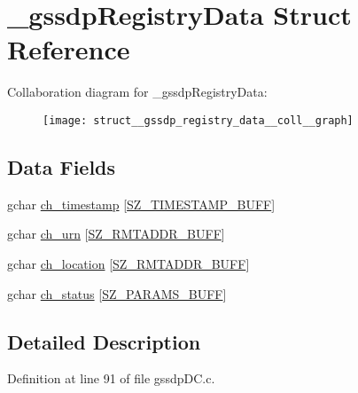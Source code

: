 \hypertarget{struct__gssdp_registry_data}{\section{\+\_\+gssdp\+Registry\+Data Struct Reference}
\label{struct__gssdp_registry_data}
}


Collaboration diagram for \+\_\+gssdp\+Registry\+Data\+:\nopagebreak
\begin{figure}[H]
\begin{center}
\leavevmode
\texttt{[image: struct\_\_gssdp\_registry\_data\_\_coll\_\_graph]}
\end{center}
\end{figure}
\subsection*{Data Fields}
\begin{DoxyCompactItemize}
\item 
gchar \hyperlink{struct__gssdp_registry_data_a97c1fccf55465d4de2168be0d70e2707}{ch\+\_\+timestamp} \mbox{[}\hyperlink{gtk_d_s_8c_ac08ad1b127f1c9743c5592ffb796423f}{S\+Z\+\_\+\+T\+I\+M\+E\+S\+T\+A\+M\+P\+\_\+\+B\+U\+F\+F}\mbox{]}
\item 
gchar \hyperlink{struct__gssdp_registry_data_a57a14b78092cbef8cf6dfa56cffa03db}{ch\+\_\+urn} \mbox{[}\hyperlink{gtk_d_s_8c_a152ca8fa1a2eac39d1badafb6c6cef8c}{S\+Z\+\_\+\+R\+M\+T\+A\+D\+D\+R\+\_\+\+B\+U\+F\+F}\mbox{]}
\item 
gchar \hyperlink{struct__gssdp_registry_data_ac1ca256d22c387e9ef968fb8413d7796}{ch\+\_\+location} \mbox{[}\hyperlink{gtk_d_s_8c_a152ca8fa1a2eac39d1badafb6c6cef8c}{S\+Z\+\_\+\+R\+M\+T\+A\+D\+D\+R\+\_\+\+B\+U\+F\+F}\mbox{]}
\item 
gchar \hyperlink{struct__gssdp_registry_data_a92d851353d8779ad1c5dd4e540a956e5}{ch\+\_\+status} \mbox{[}\hyperlink{gtk_d_s_8c_ac21e8a77d073e7a5383c92bb485992c8}{S\+Z\+\_\+\+P\+A\+R\+A\+M\+S\+\_\+\+B\+U\+F\+F}\mbox{]}
\end{DoxyCompactItemize}


\subsection{Detailed Description}


Definition at line 91 of file gssdp\+D\+C.\+c.



